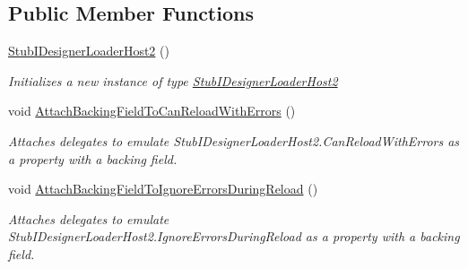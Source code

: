 \subsection*{Public Member Functions}
\begin{DoxyCompactItemize}
\item 
\hyperlink{class_system_1_1_component_model_1_1_design_1_1_serialization_1_1_fakes_1_1_stub_i_designer_loader_host2_a8cede9af44c3aebd69c192bd0b3a24db}{Stub\-I\-Designer\-Loader\-Host2} ()
\begin{DoxyCompactList}\small\item\em Initializes a new instance of type \hyperlink{class_system_1_1_component_model_1_1_design_1_1_serialization_1_1_fakes_1_1_stub_i_designer_loader_host2}{Stub\-I\-Designer\-Loader\-Host2}\end{DoxyCompactList}\item 
void \hyperlink{class_system_1_1_component_model_1_1_design_1_1_serialization_1_1_fakes_1_1_stub_i_designer_loader_host2_afb46e713737d7c8816588c1b406c69bc}{Attach\-Backing\-Field\-To\-Can\-Reload\-With\-Errors} ()
\begin{DoxyCompactList}\small\item\em Attaches delegates to emulate Stub\-I\-Designer\-Loader\-Host2.\-Can\-Reload\-With\-Errors as a property with a backing field.\end{DoxyCompactList}\item 
void \hyperlink{class_system_1_1_component_model_1_1_design_1_1_serialization_1_1_fakes_1_1_stub_i_designer_loader_host2_ab9f2aa4854d848b96fe482df8efc788f}{Attach\-Backing\-Field\-To\-Ignore\-Errors\-During\-Reload} ()
\begin{DoxyCompactList}\small\item\em Attaches delegates to emulate Stub\-I\-Designer\-Loader\-Host2.\-Ignore\-Errors\-During\-Reload as a property with a backing field.\end{DoxyCompactList}\end{DoxyCompactItemize}
